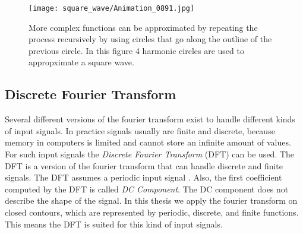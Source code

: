 \documentclass[thesis.tex]{subfiles}
\begin{document}
%
%

\begin{figure}[h]
\centering
\texttt{[image: square\_wave/Animation\_0891.jpg]}
\caption{More complex functions can be approximated by repeating the process recursively by using circles that go along the outline of the previous circle. In this figure 4 harmonic circles are used to appropximate a square wave.}
\label{fig:fourier_square}
\end{figure}

\subsection{Discrete Fourier Transform}
Several different versions of the fourier transform exist to handle different kinds of input signals. In practice signals usually are finite and discrete, because memory in computers is limited and cannot store an infinite amount of values. For such input signals the \textit{Discrete Fourier Transform} (DFT) can be used. The DFT is a version of the fourier transform that can handle discrete and finite signals. The DFT assumes a periodic input signal \cite{dspguide}. Also, the first coefficient computed by the DFT is called \textit{DC Component}. The DC component does not describe the shape of the signal. In this thesis we apply the fourier transform on closed contours, which are represented by periodic, discrete, and finite functions. This means the DFT is suited for this kind of input signals.
\newpage
\end{document}
